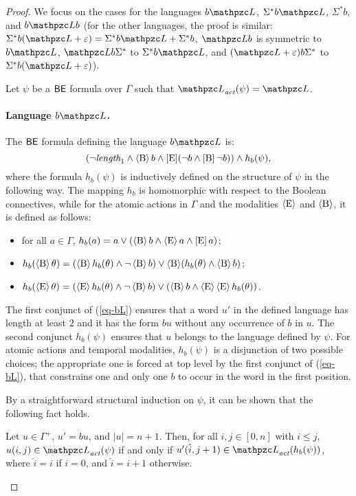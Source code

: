   \begin{proof}
We focus on the cases for the languages $b\Lang$, $\Sigma^* b\Lang$, $\Sigma^* b$, and  $b \Lang b$ (for the other languages, the proof is similar: $\Sigma^*b(\Lang + \varepsilon)=\Sigma^* b\Lang+ \Sigma^* b$, $\Lang b$ is symmetric to $b\Lang$, $\Lang b\Sigma^*$ to $\Sigma^* b\Lang$, and $ (\Lang+\varepsilon) b \Sigma^* $ to $\Sigma^*b(\Lang + \varepsilon)$). 

Let $\psi$ be a $\mathsf{BE}$ formula over $\Gamma$ such that $\Lang_\act(\psi)=\Lang$. 

\paragraph{Language $b\Lang$.} The $\mathsf{BE}$ formula defining the language $b\Lang$ is:
%
\begin{equation}
\label{eq-bL}
(\neg \textit{length}_1 \wedge \operatorname{\langle B\rangle} b \wedge \operatorname{\mathopen[ E \mathclose]}(\neg b \wedge \operatorname{\mathopen[ B \mathclose]}\neg b)) \wedge h_b(\psi),
\end{equation}
%
where the  formula  $h_b(\psi)$ is inductively defined on the structure of $\psi$ in the following way. The mapping $h_b$ is homomorphic with respect to the Boolean connectives, while for the atomic actions in $\Gamma$ and the modalities $\operatorname{\langle E\rangle}$ and $\operatorname{\langle B\rangle}$, it is defined  as follows:
 \begin{itemize}
   \item for all $a\in \Gamma$, $h_b(a)= a\vee (\operatorname{\langle B\rangle} b \wedge \operatorname{\langle E\rangle} a \wedge \operatorname{\mathopen[ E \mathclose]} a)$;
   \item $h_b(\operatorname{\langle B\rangle}\theta)= (\operatorname{\langle B\rangle} h_b(\theta) \wedge \neg\operatorname{\langle B\rangle} b) \vee \operatorname{\langle B\rangle}(h_b(\theta)\wedge \operatorname{\langle B\rangle} b)$;
   \item $h_b(\operatorname{\langle E\rangle}\theta)= (\operatorname{\langle E\rangle} h_b(\theta) \wedge \neg\operatorname{\langle B\rangle} b) \vee (\operatorname{\langle B\rangle} b \wedge \operatorname{\langle E\rangle} \operatorname{\langle E\rangle} h_b(\theta))$.
 \end{itemize}
The first conjunct of (\ref{eq-bL}) ensures that a word $u'$ in the defined language has length at least $2$ and it has the form $bu$ without any occurrence of $b$ in $u$. The second conjunct $h_b(\psi)$ ensures that $u$ belongs to the language defined by $\psi$. For atomic actions and temporal modalities, $h_b(\psi)$ is a disjunction of two possible choices; the appropriate one is forced at top level by the first conjunct of (\ref{eq-bL}), that constrains one and only one $b$ to occur in the word in the first position.

By a straightforward structural induction on $\psi$, it can be shown that the following fact holds.

\begin{claim}\label{cl:claim1} Let $u\in \Gamma^{+}$, $u'= bu$, and $|u|= n+1$. Then, for all $i,j \in [0,n]$ with $i\leq j$, $u(i,j) \in \Lang_\act(\psi)$
if and only if $u'(\hat{i},j+1)\in \Lang_\act(h_b(\psi))$, where  $\hat{i}= i$ if $i=0$, and $\hat{i}=i+1$ otherwise.
\end{claim}


\end{proof}
